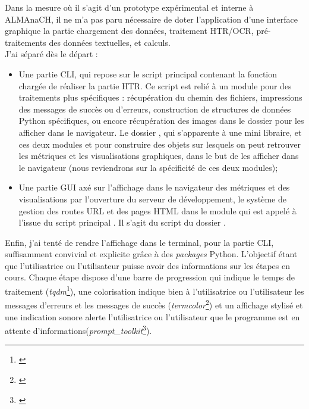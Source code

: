 Dans la mesure où il s'agit d'un prototype expérimental et interne à ALMAnaCH, il ne m'a pas paru nécessaire de doter l'application d'une interface graphique la partie chargement des données, traitement HTR/OCR, pré-traitements des données textuelles, et calculs. \\

J'ai séparé dès le départ :

\begin{itemize}
    \item Une partie CLI, qui repose sur le script principal  contenant la fonction chargée de réaliser la partie HTR. Ce script est relié à un module pour des traitements plus spécifiques  : récupération du chemin des fichiers, impressions des messages de succès ou d'erreurs, construction de structures de données Python spécifiques, ou encore récupération des images dans le dossier  pour les afficher dans le navigateur. Le dossier , qui s'apparente à une mini libraire, et ces deux modules  et  pour construire des objets sur lesquels on peut retrouver les métriques et les visualisations graphiques, dans le but de les afficher dans le navigateur (nous reviendrons sur la spécificité de ces deux modules);\\
     \item Une partie GUI axé sur l'affichage dans le navigateur des métriques et des visualisations par l'ouverture du serveur de développement, le système de gestion des routes URL et des pages HTML dans le module  qui est appelé à l'issue du script principal . Il s'agit du script  du dossier .
\end{itemize}
\bigskip
Enfin, j'ai tenté de rendre l'affichage dans le terminal, pour la partie CLI, suffisamment convivial et explicite grâce à des \textit{packages} Python. L'objectif étant que l'utilisatrice ou l'utilisateur puisse avoir des informations sur les étapes en cours. Chaque étape dispose d'une barre de progression qui indique le temps de traitement (\textit{tqdm}\footnote{\cite{noauthor_tqdm_nodate}}), une colorisation indique bien à l'utilisatrice ou l'utilisateur les messages d'erreurs et les messages de succès (\textit{termcolor}\footnote{\cite{noauthor_termcolor_nodate}}) et un affichage stylisé et une indication sonore alerte l'utilisatrice ou l'utilisateur que le programme est en attente d'informations(\textit{prompt\_toolkit}\footnote{\cite{noauthor_prompt-toolkit_nodate}}). 

